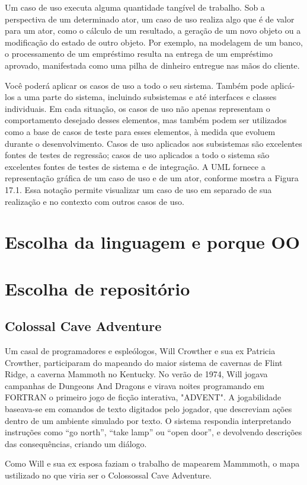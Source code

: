 \documentclass[12pt,a4paper]{article}
\begin{document}
Um caso de uso executa alguma quantidade tangível de trabalho. Sob a
perspectiva de um determinado ator, um caso de uso realiza algo que é de valor
para um ator, como o cálculo de um resultado, a geração de um novo objeto ou
a modificação do estado de outro objeto. Por exemplo, na modelagem de um
banco, o processamento de um empréstimo resulta na entrega de um empréstimo aprovado, manifestada como uma pilha de dinheiro entregue nas mãos do
cliente.

Você poderá aplicar os casos de uso a todo o seu sistema. Também pode
aplicá-los a uma parte do sistema, incluindo subsistemas e até interfaces e classes
individuais. Em cada situação, os casos de uso não apenas representam o comportamento desejado desses elementos, mas também podem ser utilizados como
a base de casos de teste para esses elementos, à medida que evoluem durante o
desenvolvimento. Casos de uso aplicados aos subsistemas são excelentes fontes
de testes de regressão; casos de uso aplicados a todo o sistema são excelentes
fontes de testes de sistema e de integração. A UML fornece a representação gráfica de um caso de uso e de um ator, conforme mostra a Figura 17.1. Essa notação permite visualizar um caso de uso em separado de sua realização e no contexto com outros casos de uso.
\section{Escolha da linguagem e porque OO}
\section{Escolha de repositório}
\subsection{Colossal Cave Adventure}

Um casal de programadores e espleólogos, Will Crowther e sua ex Patricia Crowther, participaram do mapeando do maior sistema de cavernas de Flint Ridge, a caverna Mammoth no Kentucky. No verão de 1974, Will jogava campanhas de Dungeons And Dragons e virava noites programando em FORTRAN o primeiro jogo de ficção interativa, "ADVENT". A jogabilidade baseava-se em comandos de texto digitados pelo jogador, que descreviam ações dentro de um ambiente simulado por texto. O sistema respondia interpretando instruções como “go north”, “take lamp” ou “open door”, e devolvendo descrições das consequências, criando um diálogo.

Como Will e sua ex esposa faziam o trabalho de mapearem Mammmoth, o mapa ustilizado no que viria ser o Colossossal Cave Adventure.  
\end{document}
